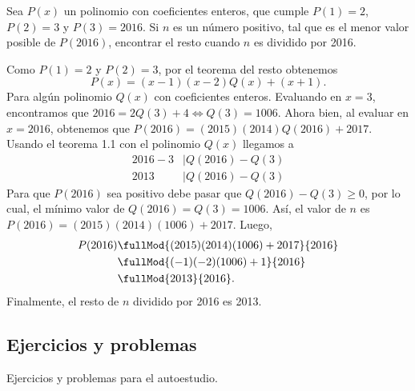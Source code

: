 \begin{example}
    Sea $P(x)$ un polinomio con coeficientes enteros, que cumple $P(1) = 2$, $P(2) = 3$ y $P(3) = 2016$.
    Si $n$ es un número positivo, tal que es el menor valor posible de $P(2016)$, encontrar el resto cuando $n$ es dividido por 2016.
\end{example}
\begin{solution}
    Como $P(1) = 2$ y $P(2) = 3$, por el teorema del resto obtenemos
    \[
        P(x) = (x - 1)(x - 2)Q(x) + (x + 1).
    \]
    Para algún polinomio $Q(x)$ con coeficientes enteros.
    Evaluando en $x = 3$, encontramos que $2016 = 2Q(3) + 4 \iff Q(3) = 1006$.
    Ahora bien, al evaluar en $x = 2016$, obtenemos que $P(2016) = (2015)(2014)Q(2016) + 2017$.
    Usando el teorema 1.1 con el polinomio $Q(x)$ llegamos a
    \begin{align*}
        2016 - 3 &\mid Q(2016) - Q(3)\\
        2013 &\mid Q(2016) - Q(3)
    \end{align*}
    Para que $P(2016)$ sea positivo debe pasar que $Q(2016) - Q(3) \geq 0$, por lo cual, el mínimo valor de $Q(2016) = Q(3) = 1006$.
    Así, el valor de $n$ es $P(2016) = (2015)(2014)(1006) + 2017$.
    Luego,
    \begin{align*}
        P(2016) &\fullMod{(2015)(2014)(1006) + 2017}{2016}\\
         &\fullMod{(-1)(-2)(1006) + 1}{2016}\\
         &\fullMod{2013}{2016}.
    \end{align*}
    Finalmente, el resto de $n$ dividido por 2016 es 2013.
\end{solution}



\subsection{Ejercicios y problemas}

Ejercicios y problemas para el autoestudio.

